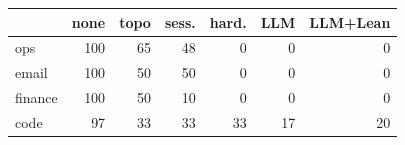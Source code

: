 \begin{tabular}{lrrrrrr}
\toprule
& none & topo & sess. & hard. & LLM & LLM+Lean\\
\midrule
ops & 100 & 65 & 48 & 0 & 0 & 0 \\
email & 100 & 50 & 50 & 0 & 0 & 0 \\
finance & 100 & 50 & 10 & 0 & 0 & 0 \\
code & 97 & 33 & 33 & 33 & 17 & 20 \\
\bottomrule
\end{tabular}
